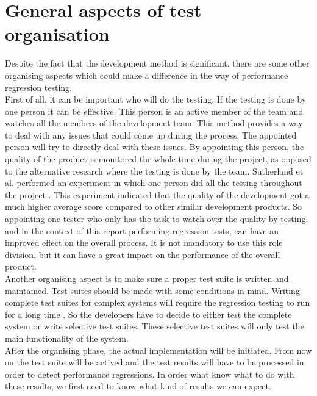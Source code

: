 \section{General aspects of test organisation}
Despite the fact that the development method is significant, there are some other organising aspects which could make a difference in the way of performance regression testing. \\
First of all, it can be important who will do the testing. If the testing is done by one person it can be effective. This person is an active member of the team and watches all the members of the development team. This method provides a way to deal with any issues that could come up during the process. The appointed person will try to directly deal with these issues. By appointing this person, the quality of the product is monitored the whole time during the project, as opposed to the alternative research where the testing is done by the team.  Sutherland et al. performed an experiment in which one person did all the testing throughout the project \cite{sutherland2009fully}. This experiment indicated that the quality of the development got a much higher average score compared to other similar development products. So appointing one tester who only has the task to watch over the quality by testing, and in the context of this report performing regression tests, can have an improved effect on the overall process. It is not mandatory to use this role division, but it can have a great impact on the performance of the overall product. \\

Another organising aspect is to make sure a proper test suite is  written and maintained. Test suites should be made with some conditions in mind. Writing complete test suites for complex systems will require the regression testing to run for a long time \cite{rothermel2001prioritizing}. So the developers have to decide to either test the complete system or write selective test suites. These selective test suites will only test the main functionality of the system. \\
After the organising phase, the actual implementation will be initiated. From now on the test suite will be actived and the test results will have to be processed in order to detect performance regressions. In order what know what to do with these results, we first need to know what kind of results we can expect.
